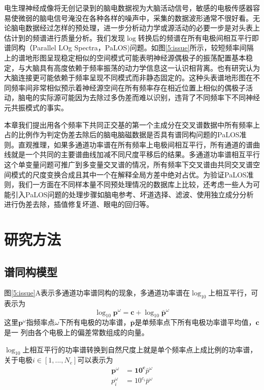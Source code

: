 电生理神经成像将无创记录到的脑电数据视为大脑活动信号，敏感的电极传感器容易使微弱的脑电信号淹没在各种各样的噪声中，采集的数据波形通常不很好看。无论脑电数据经过怎样的预处理，进一步分析动力学或源活动的必要一步是对头表上估计到的频谱进行质量分析。我们发现$\log$转换后的频谱在所有电极间相互平行即谱同构（Parallel LOg Spectra，PaLOS)问题。如图\ref{5:issue}所示，较短频率间隔上的谱地形图呈现稳定相似的空间模式可能表明神经源偶极子的振荡配置基本稳定，与大脑具有高度依赖于频率振荡的动力学信息这一认识相背离。也有研究认为大脑连接更可能依赖于频率呈现不同模式而非静态固定的。这种头表谱地形图在不同频率间非常相似预示着神经源空间在所有频率存在相近位置上相似的偶极子活动，脑电的实际源可能因为去除过多伪差而难以识别，违背了不同频率下不同神经元共振模式的事实。

本章我们提出用各个频率下共同正交基的第一个主成分在交叉谱数据中所有频率上占的比例作为判定伪差去除后的脑电脑磁数据是否具有谱同构问题的PaLOS准则。直观推理，如果多通道功率谱在所有频率上电极间相互平行，所有通道的谱曲线就是一个共同的主要谱曲线加减不同尺度平移后的结果。多通道功率谱相互平行这个单变量问题可推广到多变量交叉谱的情况，所有频率下交叉谱由共同交叉谱空间模式的尺度变换合成且其中一个在解释全局方差中绝对占优。为验证PaLOS准则，我们一方面在不同样本量不同预处理情况的数据库上比较，还考虑一些人为可能引入PaLOS问题的处理步骤如脑电参考、坏道选择、滤波、使用独立成分分析进行伪差去除，插值修复坏道、眼电的回归等。 

\section{研究方法}
\subsection{谱同构模型}
图\ref{5:issue}A表示多通道功率谱同构的现象，多通道功率谱在$\log_{10}$上相互平行，可表示为
\begin{equation}\label{eq5.1}
\log_{10}\mathbf{p}^\omega=\mathbf{c}+\log_{10}\bar{\mathbf{p}}^\omega
\end{equation}
这里$\mathbf{p}^\omega$指频率点$\omega$下所有电极的功率谱，$\bar{\mathbf{p}}$是单频率点下所有电极功率谱平均值，$\mathbf{c}$是一
列由各个电极上的偏差常数组成的向量。

$\log_{10}$上相互平行的功率谱转换到自然尺度上就是单个频率点上成比例的功率谱，关于电极$i\in[1,...,N_e]$可以表示为
\begin{equation}\label{eq5.2}
\begin{aligned}
\mathbf{p}^\omega& =\mathbf{10^c}\bar{p}^\omega\\
p_i^\omega& =10^{c_i}\bar{p}^\omega
\end{aligned}
\end{equation}

